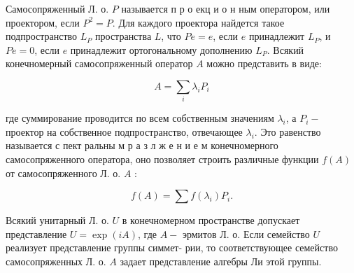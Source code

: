 \documentclass[10pt]{article}
\begin{document}
Самосопряженный Л. о. $P$ называется п р о екц и о н ным оператором, или проектором, если $P^{2}=P$. Для каждого проектора найдется такое подпространство $L_{P}$ пространства $L$, что $P e=e$, если $e$ принадлежит $L_{P}$, и $P e=0$, если $e$ принадлежит ортогональному дополнению $L_{P}$. Всякий конечномерный самосопряженный оператор $A$ можно представить в виде:



\[

A=\sum_{i} \lambda_{i} P_{i}

\]



где суммирование проводится по всем собственным значениям $\lambda_{i}$, а $P_{i}-$ проектор на собственное подпространство, отвечающее $\lambda_{i}$. Это равенство называется с пект ральны м р а з л ж е н и е м конечномерного самосопряженного оператора, оно позволяет строить различные функции $f(A)$ от самосопряженного Л. о. $A$ :



\[

f(A)=\sum f\left(\lambda_{i}\right) P_{i} .

\]



Всякий унитарный Л. о. $U$ в конечномерном пространстве допускает представление $U=\exp (i A)$, где $A-$ эрмитов Л. о. Если семейство $U$ реализует представление группы симмет- рии, то соответствующее семейство самосопряженных Л. о. $A$ задает представление алгебры Ли этой группы.
\end{document}
